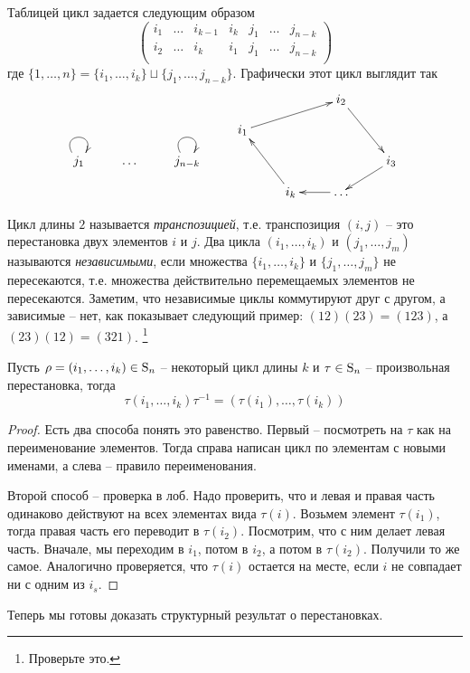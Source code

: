 Таблицей цикл задается следующим образом
\[
\begin{pmatrix}
{i_1}&{\ldots}&{i_{k-1}}&{i_k}&{j_1}&{\ldots}&{j_{n-k}}\\
{i_2}&{\ldots}&{i_k}&{i_1}&{j_{1}}&{\ldots}&{j_{n-k}}\\
\end{pmatrix}
\]
где $\{1,\ldots,n\} = \{i_1,\ldots,i_k\}\sqcup\{j_1,\ldots,j_{n-k}\}$.
Графически этот цикл выглядит так
\[
\xymatrix@R=10pt{
	{}&{}&{}&{}&{}&{i_2}\ar[rdd]&{}\\
	{}&{}&{}&{i_1}\ar[urr]&{}&{}&{}\\
	{j_1}\ar@(ul,ur)&{\ldots}&{j_{n-k}}\ar@(ul,ur)&{}&{}&{}&{i_3}\ar[dl]\\
	{}&{}&{}&{}&{i_k}\ar[uul]&{\ldots}\ar[l]&{}\\
}
\]

Цикл длины $2$ называется {\it транспозицией}, т.е. транспозиция $(i,j)$ -- это перестановка двух элементов $i$ и $j$.
Два цикла $(i_1,\ldots,i_k)$ и $(j_1,\ldots,j_m)$ называются {\it независимыми}, если множества $\{i_1,\ldots,i_k\}$ и $\{j_1,\ldots,j_m\}$ не пересекаются, т.е. множества действительно перемещаемых элементов не пересекаются.
Заметим, что независимые циклы коммутируют друг с другом, а зависимые -- нет, как показывает следующий пример: $(12)(23) = (123)$, а $(23)(12) = (321)$.%
\footnote{Проверьте это.}

\begin{claim}
\label{claim:CycleRename}
Пусть $\rho = (i_1,\ldots, i_k)\in\operatorname{S}_{n}$ -- некоторый цикл длины $k$ и $\tau\in\operatorname{S}_{n}$ -- произвольная перестановка, тогда 
\[
\tau(i_1,\ldots,i_k)\tau^{-1} = (\tau(i_1),\ldots,\tau(i_k))
\]
\end{claim}
\begin{proof}
Есть два способа понять это равенство.
Первый -- посмотреть на $\tau$ как на переименование элементов.
Тогда справа написан цикл по элементам с новыми именами, а слева -- правило переименования.

Второй способ -- проверка в лоб.
Надо проверить, что и левая и правая часть одинаково действуют на всех элементах вида $\tau(i)$.
Возьмем элемент $\tau(i_1)$, тогда правая часть его переводит в $\tau(i_2)$.
Посмотрим, что с ним делает левая часть.
Вначале, мы переходим в $i_1$, потом в $i_2$, а потом в $\tau(i_2)$.
Получили то же самое.
Аналогично проверяется, что $\tau(i)$ остается на месте, если $i$ не совпадает ни с одним из $i_s$.
\end{proof}

Теперь мы готовы доказать структурный результат о перестановках.

